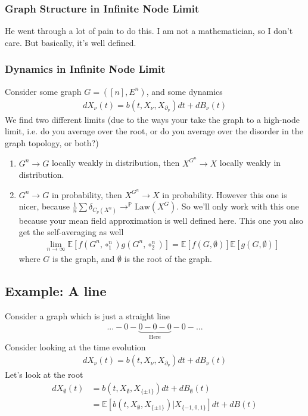 \documentclass[12pt,fleqn]{article}
\numberwithin{equation}{section} %
\begin{document}
\subsubsection{Graph Structure in Infinite Node Limit}
He went through a lot of pain to do this. I am not a mathematician, so I don't care. But basically, it's well defined.

\subsubsection{Dynamics in Infinite Node Limit}
Consider some graph $G = ([n], E^n)$, and some dynamics
\begin{align}
	dX_\nu(t) = b(t, X_\nu, X_{\partial_\nu}) dt + dB_\nu(t)
\end{align}
We find two different limits (due to the ways your take the graph to a high-node limit, i.e. do you average over the root, or do you average over the disorder in the graph topology, or both?)
\begin{enumerate}
	\item $G^n \to G$ locally weakly in distribution, then $X^{G^n} \to X$ locally weakly in distribution.
	\item $G^n \to G$ in probability, then $X^{G^n} \to X$ in probability. However this one is nicer, because $\frac{1}{n} \sum \delta_{C_{\nu}(X^n)} \to^{\mathbb P} \text{Law}(X^G)$. So we'll only work with this one because your mean field approximation is well defined here. This one you also get the self-averaging as well
	\begin{align}
		\lim_{n\to \infty} \mathbb E[f(G^n, \circ^n_1) g(G^n, \circ^n_2)] = \mathbb E[f(G, \emptyset )] \mathbb E[g(G, \emptyset)]
	\end{align}
	where $G$ is the graph, and $\emptyset$ is the root of the graph.
\end{enumerate}
\subsection{Example: A line}
Consider a graph which is just a straight line
\begin{align}
	...-0-\underbrace{0-0-0}_{\text{Here}}-0-...
\end{align}
Consider looking at the time evolution 
\begin{align}
	dX_\nu(t) = b(t, X_\nu, X_{\partial_\nu}) dt + dB_\nu(t)
\end{align}
Let's look at the root
\begin{align}
	dX_{\emptyset}(t) & = b(t,  X_{\emptyset},  X_{\{\pm 1\}}) dt + dB_{\emptyset}(t)\\
	& = \mathbb E[b(t,  X_{\emptyset}, X_{\{\pm 1\}}) | X_{\{-1, 0, 1\}}] dt + dB(t)
\end{align}
\end{document}
